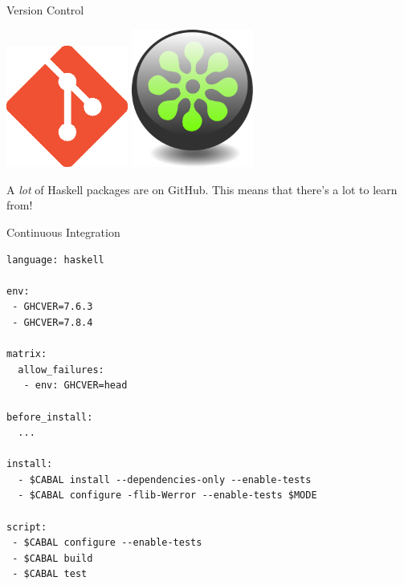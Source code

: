 \documentclass[20pt]{beamer}
\begin{document}
\begin{frame}{Version Control}

  \begin{center}
    \includegraphics[width=4cm]{git.eps}
    \hspace{3cm}
    \includegraphics[width=4cm]{darcs.eps}
  \end{center}

  \vspace{2cm}

  A \textit{lot} of Haskell packages are on GitHub. This means that
  there's a lot to learn from!

  \vspace{5cm}
\end{frame}

\begin{frame}[fragile]{Continuous Integration}
\begin{verbatim}
language: haskell

env:
 - GHCVER=7.6.3
 - GHCVER=7.8.4

matrix:
  allow_failures:
   - env: GHCVER=head

before_install:
  ...

install:
  - $CABAL install --dependencies-only --enable-tests
  - $CABAL configure -flib-Werror --enable-tests $MODE

script:
 - $CABAL configure --enable-tests
 - $CABAL build
 - $CABAL test
\end{verbatim}
\end{frame}
\end{document}
